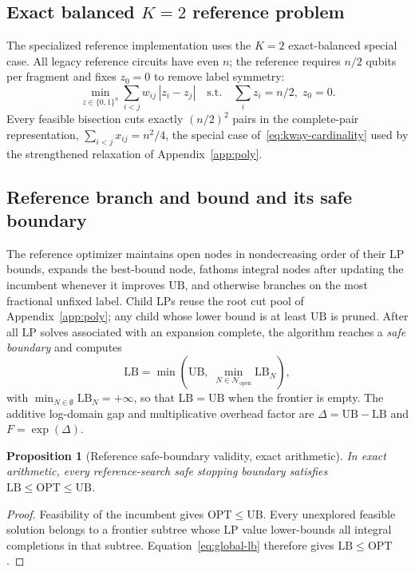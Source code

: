 \documentclass[
  aps,
  pra,
  reprint,
  amsmath,
  amssymb,
  longbibliography,
  nofootinbib,
  floatfix
]{revtex4-2}
\theoremstyle{plain}
\newtheorem{proposition}{Proposition}
\newcommand{\OPT}{\mathrm{OPT}}
\newcommand{\LB}{\mathrm{LB}}
\newcommand{\UB}{\mathrm{UB}}
\newcommand{\gap}{\Delta}
\begin{document}
\subsection{Exact balanced $K\!=\!2$ reference problem}

The specialized reference implementation uses the $K=2$ exact-balanced special case. All legacy reference circuits have even $n$; the reference requires $n/2$ qubits per fragment and fixes $z_0=0$ to remove label symmetry:
\begin{equation}
  \min_{z \in \{0,1\}^n} \sum_{i<j} w_{ij}\,|z_i - z_j|
  \quad \text{s.t.} \quad \textstyle\sum_i z_i = n/2,\; z_0 = 0.
  \label{eq:balanced}
\end{equation}
Every feasible bisection cuts exactly $(n/2)^2$ pairs in the complete-pair representation, $\sum_{i<j}x_{ij}=n^2/4$, the special case of~\eqref{eq:kway-cardinality} used by the strengthened relaxation of Appendix~\ref{app:poly}.

\subsection{Reference branch and bound and its safe boundary}

The reference optimizer maintains open nodes in nondecreasing order of their LP bounds, expands the best-bound node, fathoms integral nodes after updating the incumbent whenever it improves $\UB$, and otherwise branches on the most fractional unfixed label. Child LPs reuse the root cut pool of Appendix~\ref{app:poly}; any child whose lower bound is at least $\UB$ is pruned. After all LP solves associated with an expansion complete, the algorithm reaches a \emph{safe boundary} and computes
\begin{equation}
  \LB = \min\!\left(\UB,\; \min_{N \in \mathcal{N}_{\mathrm{open}}} \LB_N\right),
  \label{eq:global-lb}
\end{equation}
with $\min_{N\in\emptyset}\LB_N=+\infty$, so that $\LB=\UB$ when the frontier is empty. The additive log-domain gap and multiplicative overhead factor are $\gap=\UB-\LB$ and $F=\exp(\gap)$.

\begin{proposition}[Reference safe-boundary validity, exact arithmetic]\label{prop:safe-boundary}
In exact arithmetic, every reference-search safe stopping boundary satisfies $\LB\leq\OPT\leq\UB$.
\end{proposition}
\begin{proof}
Feasibility of the incumbent gives $\OPT\leq\UB$. Every unexplored feasible solution belongs to a frontier subtree whose LP value lower-bounds all integral completions in that subtree. Equation~\eqref{eq:global-lb} therefore gives $\LB\leq\OPT$.
\end{proof}
\end{document}
